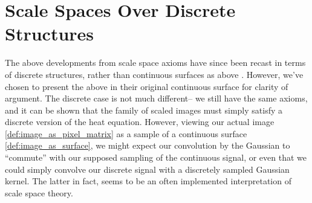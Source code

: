 %    	
%    	
%    
    
    
    \section{Scale Spaces Over Discrete Structures} \label{subsec:discrete-scale-space}
    
    The above developments from scale space axioms have since
    been recast in terms of discrete structures, rather than continuous surfaces as above \autocite{lindeberg-discrete}. However, we've chosen to present the above in their original continuous surface for clarity of argument. The discrete case is not much different--
    we still have the same axioms, and it can be shown that the family of scaled images
    must simply satisfy a discrete version of the heat equation.
    However, viewing our actual image
    \cref{def:image_as_pixel_matrix} as a sample of a continuous
    surface \cref{def:image_as_surface},
    we might  expect our convolution by the Gaussian to ``commute'' with our supposed sampling of the continuous signal,
    or even that we could simply convolve our discrete signal with a discretely sampled Gaussian kernel. The latter in fact, seems to be an often implemented interpretation of scale space theory.
    
